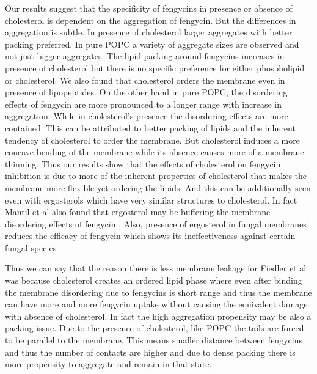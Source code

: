 Our results suggest that the specificity of fengycins in 
presence or absence of cholesterol is dependent on the aggregation of fengycin.
But the differences in aggregation is subtle. In presence of cholesterol
larger aggregates with better packing preferred.
In pure POPC a variety of aggregate sizes are observed and not just bigger aggregates.
The lipid packing around fengycins increases in presence of cholesterol
but there is no specific preference for either phospholipid or cholesterol.
We also found that cholesterol orders the membrane even in presence of lipopeptides. 
On the other hand in pure POPC, the disordering effects of fengycin are more pronounced to a
longer range with increase in aggregation.
While in cholesterol's presence the disordering effects are more contained. This can be 
attributed to better packing of lipids and the inherent tendency of cholesterol to order the
membrane. But cholesterol induces a more concave bending of the membrane while its absence 
causes more of a membrane thinning. Thus our results show that the effects of cholesterol on
fengycin inhibition is due to more of the inherent properties of cholesterol that makes the 
membrane more flexible yet ordering the lipids. 
And this can be additionally seen even with ergosterols which have very similar structures 
to cholesterol.
In fact Mantil et al also found that ergosterol may be buffering the membrane disordering 
effects of fengycin \cite{MantilAvis2019,MantilTyler2019}.
Also, presence of ergosterol in fungal membranes reduces the efficacy of fengycin which 
shows its ineffectiveness against certain fungal species

Thus we can say that the reason there is less membrane leakage for Fiedler et al 
\cite{Heerklotz2015} was because 
cholesterol creates an ordered lipid phase where even after binding the membrane disordering
due to fengycins is short range and thus the membrane can have more and more fengycin uptake
without causing the equivalent damage with absence of cholesterol.
In fact the high aggregation propensity may be also a packing issue. Due to the presence of
cholesterol, like POPC the tails are forced to be parallel to the membrane. This means
smaller distance between fengycins and thus the number of contacts are higher and due to
dense packing there is more propensity to aggregate and remain in that state.

